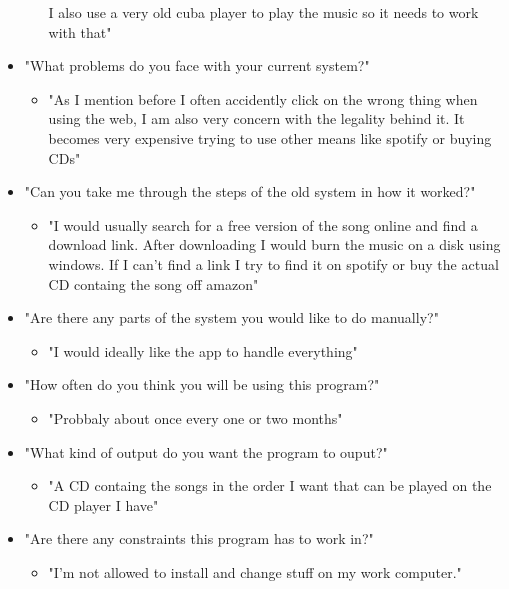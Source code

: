\documentclass{article}
\begin{document}
\begin{itemize}
\begin{itemize}
            I also use a very old cuba player to play the music so it needs to work with that"
    \end{itemize}
    \item "What problems do you face with your current system?"
    \begin{itemize}
        \item "As I mention before I often accidently click on the wrong thing when using the web, I am also very concern with
            the legality behind it. It becomes very expensive trying to use other means like spotify or buying CDs"
    \end{itemize}
    \item "Can you take me through the steps of the old system in how it worked?"
    \begin{itemize}
        \item "I would usually search for a free version of the song online and find a download link. After downloading
            I would burn the music on a disk using windows. If I can't find a link I try to find it on spotify or
            buy the actual CD containg the song off amazon"
    \end{itemize}
    \item "Are there any parts of the system you would like to do manually?"
    \begin{itemize}
        \item "I would ideally like the app to handle everything"
    \end{itemize}
    \item "How often do you think you will be using this program?"
    \begin{itemize}
        \item "Probbaly about once every one or two months"
    \end{itemize}
    \item "What kind of output do you want the program to ouput?"
    \begin{itemize}
        \item "A CD containg the songs in the order I want that can be played on the CD player I have"
    \end{itemize}
    \item "Are there any constraints this program has to work in?"
    \begin{itemize}
        \item "I'm not allowed to install and change stuff on my work computer."
    \end{itemize}

\end{itemize}
\end{document}
